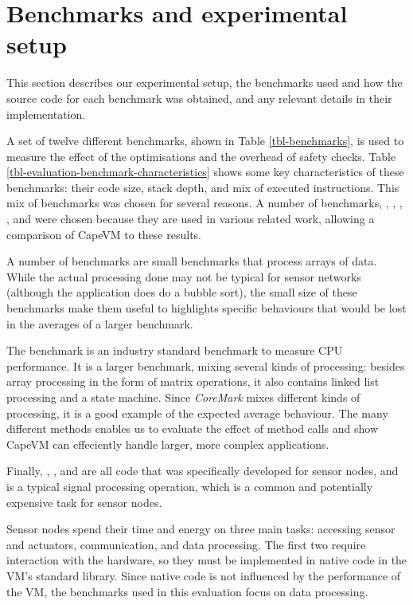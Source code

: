 \section{Benchmarks and experimental setup}
\label{sec-evaluation-benchmarks}

This section describes our experimental setup, the benchmarks used and how the source code for each benchmark was obtained, and any relevant details in their implementation.

A set of twelve different benchmarks, shown in Table \ref{tbl-benchmarks}, is used to measure the effect of the optimisations and the overhead of safety checks. Table \ref{tbl-evaluation-benchmark-characteristics} shows some key characteristics of these benchmarks: their code size, stack depth, and mix of executed instructions. This mix of benchmarks was chosen for several reasons. A number of benchmarks, , , , , and  were chosen because they are used in various related work, allowing a comparison of CapeVM to these results.

A number of benchmarks are small benchmarks that process arrays of data. While the actual processing done may not be typical for sensor networks (although the  application does do a bubble sort), the small size of these benchmarks make them useful to highlights specific behaviours that would be lost in the averages of a larger benchmark.

The  benchmark is an industry standard benchmark to measure CPU performance. It is a larger benchmark, mixing several kinds of processing: besides array processing in the form of matrix operations, it also contains linked list processing and a state machine. Since \emph{CoreMark} mixes different kinds of processing, it is a good example of the expected average behaviour. The many different methods enables us to evaluate the effect of method calls and show CapeVM can effeciently handle larger, more complex applications.

Finally, , ,  and  are all code that was specifically developed for sensor nodes, and  is a typical signal processing operation, which is a common and potentially expensive task for sensor nodes.

Sensor nodes spend their time and energy on three main tasks: accessing sensor and actuators, communication, and data processing. The first two require interaction with the hardware, so they must be implemented in native code in the VM's standard library. Since native code is not influenced by the performance of the VM, the benchmarks used in this evaluation focus on data processing.

